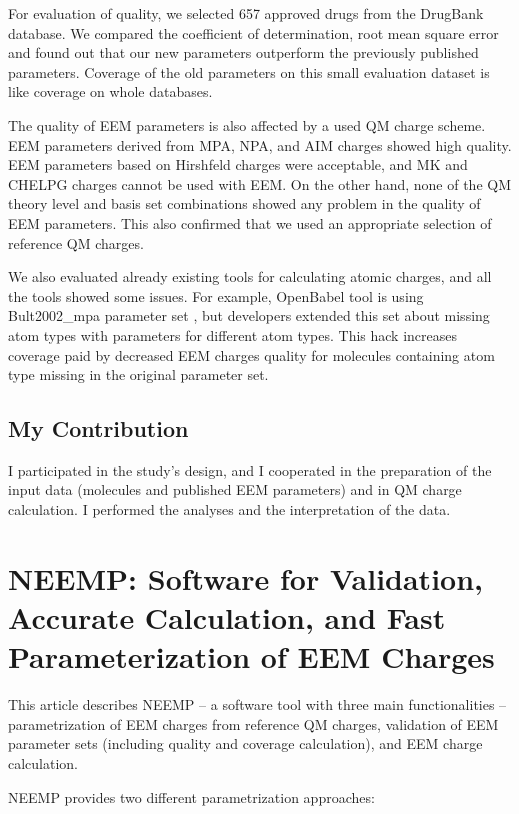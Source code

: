 For evaluation of quality, we selected 657 approved drugs from the DrugBank
database. We compared the coefficient of determination, root mean square error
and found out that our new parameters outperform the previously published
parameters. Coverage of the old parameters on this small evaluation dataset
is like coverage on whole databases.

The quality of EEM parameters is also affected by a used QM charge scheme.
EEM parameters derived from MPA, NPA, and AIM charges showed high quality.
EEM parameters based on Hirshfeld charges were acceptable, and MK and CHELPG
charges cannot be used with EEM.  On the other hand, none of the QM theory level
and basis set combinations showed any problem in the quality of EEM parameters.
This also confirmed that we used an appropriate selection of reference QM
charges.

We also evaluated already existing tools for calculating atomic charges,
and all the tools showed some issues. For example, OpenBabel tool \cite{openbabel}  is using
Bult2002\_mpa parameter set \cite{Bultinck2002}, but developers extended this
set about missing atom types with parameters for different atom types. This hack
increases coverage paid by decreased EEM charges quality for molecules
containing atom type missing in the original parameter set.  

\subsection{My Contribution}

I participated in the study's design, and I cooperated in the preparation of
the input data (molecules and published EEM parameters) and in QM charge 
calculation. I performed the analyses and the interpretation of the data.

\section{NEEMP: Software for Validation, Accurate Calculation, and Fast
Parameterization of EEM Charges} \label{sec:neemp-article}

This article describes NEEMP -- a software tool with three main
functionalities -- parametrization of EEM charges from reference QM charges,
validation of EEM parameter sets (including quality and coverage calculation),
and EEM charge calculation.

NEEMP provides two different parametrization approaches:

